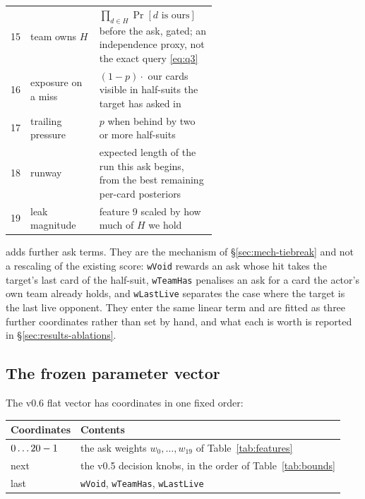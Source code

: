 \begin{table}[ht]
\begin{tabular}{rlp{0.58\linewidth}}
15 & team owns $H$       & $\prod_{d \in H}\Pr[d \text{ is ours}]$ before the ask, gated; an independence proxy, not the exact query \eqref{eq:q3} \\
16 & exposure on a miss  & $(1-p)\cdot$ our cards visible in half-suits the target has asked in \\
17 & trailing pressure   & $p$ when behind by two or more half-suits \\
18 & runway              & expected length of the run this ask begins, from the best remaining per-card posteriors \\
19 & leak magnitude      & feature 9 scaled by how much of $H$ we hold \\
\bottomrule
\end{tabular}
\end{table}

\vsix{} adds \numVsixAskTerms{} further ask terms. They are the mechanism of
\S\ref{sec:mech-tiebreak} and not a rescaling of the existing score:
\texttt{wVoid} rewards an ask whose hit takes the target's last card of
the half-suit, \texttt{wTeamHas} penalises an ask for a card the actor's own team
already holds, and \texttt{wLastLive} separates the case where the target is the
last live opponent. They enter the same linear term and are fitted as three
further coordinates rather than set by hand, and what each is worth is
reported in \S\ref{sec:results-ablations}.

\subsection{The frozen parameter vector}
\label{app:params-vector}

The v0.6 flat vector has \numVsixParams{} coordinates in one fixed order:

\begin{center}
\begin{tabular}{ll}
\toprule
Coordinates & Contents \\
\midrule
$0 \ldots 20{}-1$ & the ask weights $w_0,\dots,w_{19}$ of Table~\ref{tab:features} \\
next \numVfiveKnobs{} & the v0.5 decision knobs, in the order of Table~\ref{tab:bounds} \\
last \numVsixAskTerms{} & \texttt{wVoid}, \texttt{wTeamHas}, \texttt{wLastLive} \\
\bottomrule
\end{tabular}
\end{center}


